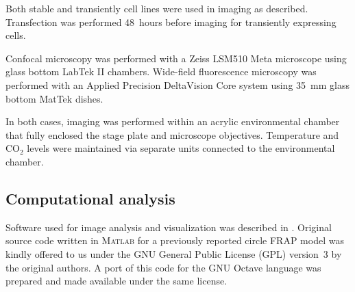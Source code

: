     Both stable and transiently cell lines were used in imaging as described.
    Transfection was performed 48~hours before imaging for transiently
    expressing cells.

    Confocal microscopy was performed with a Zeiss LSM510 Meta microscope
    using glass bottom LabTek II chambers. Wide-field fluorescence microscopy
    was performed with an Applied Precision DeltaVision Core system
    using \SI{35}{\mm} glass bottom MatTek dishes.

    In both cases, imaging was performed within an acrylic environmental
    chamber that fully enclosed the stage plate and microscope objectives.
    Temperature and CO$_2$ levels were maintained via separate units connected
    to the environmental chamber.

  \subsection{Computational analysis}

    Software used for image analysis and visualization was described in
    . Original source code written in \textsc{Matlab} for a previously
    reported circle FRAP model \citep{mueller2008evidence} was kindly offered
    to us under the GNU General Public License (GPL) version~3 by the
    original authors. A port of this code for the GNU Octave language was
    prepared and made available under the same license.

